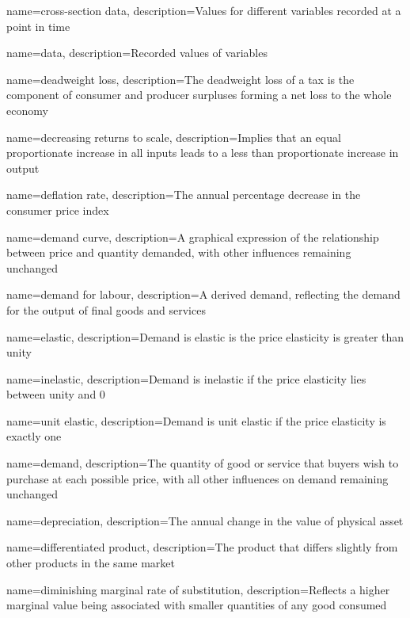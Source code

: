 {
	name={cross-section data},
	description={Values for different variables recorded at a point in time}
}

{
	name=data,
	description={Recorded values of variables}
}

{
	name={deadweight loss},
	description={The deadweight loss of a tax is the component of consumer and producer surpluses forming a net loss to the whole economy}
}

{
	name={decreasing returns to scale},
	description={Implies that an equal proportionate increase in all inputs leads to a less than proportionate increase in output}
}

{
	name={deflation rate},
	description={The annual percentage decrease in the consumer price index}
}

{
	name={demand curve},
	description={A graphical expression of the relationship between price and quantity demanded, with other influences remaining unchanged}
}

{
	name={demand for labour},
	description={A derived demand, reflecting the demand for the output of final goods and services}
}

{
	name=elastic,
	description={Demand is elastic is the price elasticity is greater than unity}
}

{
	name=inelastic,
	description={Demand is inelastic if the price elasticity lies between unity and 0}
}

{
	name={unit elastic},
	description={Demand is unit elastic if the price elasticity is exactly one}
}

{
	name=demand,
	description={The quantity of good or service that buyers wish to purchase at each possible price, with all other influences on demand remaining unchanged}
}

{
	name=depreciation,
	description={The annual change in the value of physical asset}
}

{
	name={differentiated product},
	description={The product that differs slightly from other products in the same market}
}

{
	name={diminishing marginal rate of substitution},
	description={Reflects a higher marginal value being associated with smaller quantities of any good consumed}
}


